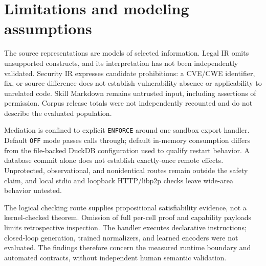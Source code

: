 \section{Limitations and modeling assumptions}
\label{sec:limits}

The source representations are models of selected information. Legal IR omits unsupported constructs, and its interpretation has not been independently validated. Security IR expresses candidate prohibitions: a CVE/CWE identifier, fix, or source difference does not establish vulnerability absence or applicability to unrelated code. Skill Markdown remains untrusted input, including assertions of permission. Corpus release totals were not independently recounted and do not describe the evaluated population.

Mediation is confined to explicit \texttt{ENFORCE} around one sandbox export handler. Default \texttt{OFF} mode passes calls through; default in-memory consumption differs from the file-backed DuckDB configuration used to qualify restart behavior. A database commit alone does not establish exactly-once remote effects. Unprotected, observational, and nonidentical routes remain outside the safety claim, and local stdio and loopback HTTP/libp2p checks leave wide-area behavior untested.

The logical checking route supplies propositional satisfiability evidence, not a kernel-checked theorem. Omission of full per-cell proof and capability payloads limits retrospective inspection. The handler executes declarative instructions; closed-loop generation, trained normalizers, and learned encoders were not evaluated. The findings therefore concern the measured runtime boundary and automated contracts, without independent human semantic validation.
